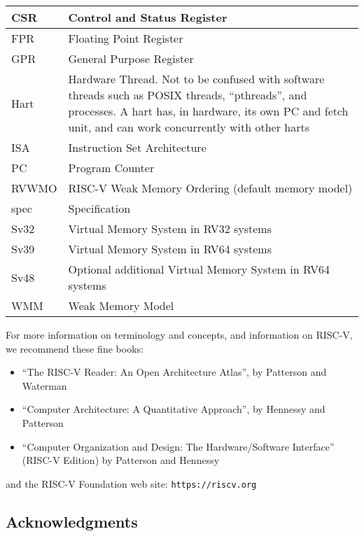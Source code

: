 \documentclass[11pt]{article}
\begin{document}
\begin{tabular}{|l|p{4.5in}|}
\hline
CSR   & Control and Status Register \\
\hline
FPR   & Floating Point Register \\
\hline
GPR   & General Purpose Register \\
\hline
Hart  & Hardware Thread.  Not to be confused with software threads
         such as POSIX threads, ``pthreads'', and processes.
	 A hart has, in hardware, its own PC and fetch unit,
	 and can work concurrently with other harts \\
\hline
ISA   & Instruction Set Architecture \\
\hline
PC    & Program Counter \\
\hline
RVWMO & RISC-V Weak Memory Ordering (default memory model) \\
\hline
spec  & Specification \\
\hline
Sv32  & Virtual Memory System in RV32 systems \\
\hline
Sv39  & Virtual Memory System in RV64 systems \\
\hline
Sv48  & Optional additional Virtual Memory System in RV64 systems \\
\hline
WMM  & Weak Memory Model \\
\hline
\end{tabular}

\vspace*{1cm}

For more information on terminology and concepts, and information on RISC-V, we recommend these fine books:

\begin{itemize}
\item
``The RISC-V Reader: An Open Architecture Atlas'', by Patterson and Waterman~\cite{Patterson2017b}

\item
``Computer Architecture: A Quantitative Approach'', by Hennessy and Patterson~\cite{Hennessy2017}

\item
``Computer Organization and Design: The Hardware/Software Interface'' (RISC-V Edition) by
     Patterson and Hennessy~\cite{Patterson2017a}
\end{itemize}

and the RISC-V Foundation web site: \verb|https://riscv.org|


\subsection*{Acknowledgments}
\end{document}

